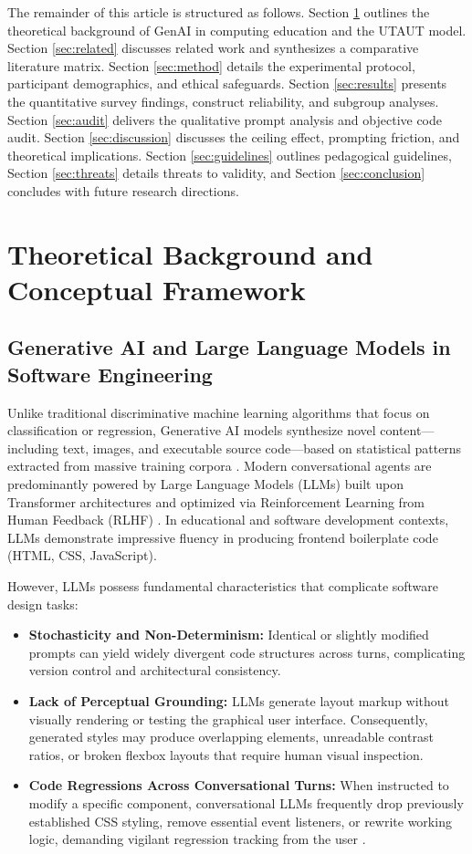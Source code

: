 \documentclass{cleiej}
\begin{document}
The remainder of this article is structured as follows. Section \ref{sec:background} outlines the theoretical background of GenAI in computing education and the UTAUT model. Section \ref{sec:related} discusses related work and synthesizes a comparative literature matrix. Section \ref{sec:method} details the experimental protocol, participant demographics, and ethical safeguards. Section \ref{sec:results} presents the quantitative survey findings, construct reliability, and subgroup analyses. Section \ref{sec:audit} delivers the qualitative prompt analysis and objective code audit. Section \ref{sec:discussion} discusses the ceiling effect, prompting friction, and theoretical implications. Section \ref{sec:guidelines} outlines pedagogical guidelines, Section \ref{sec:threats} details threats to validity, and Section \ref{sec:conclusion} concludes with future research directions.

\section{Theoretical Background and Conceptual Framework}
\label{sec:background}

\subsection{Generative AI and Large Language Models in Software Engineering}
Unlike traditional discriminative machine learning algorithms that focus on classification or regression, Generative AI models synthesize novel content---including text, images, and executable source code---based on statistical patterns extracted from massive training corpora \cite{anderson2023implementing}. Modern conversational agents are predominantly powered by Large Language Models (LLMs) built upon Transformer architectures and optimized via Reinforcement Learning from Human Feedback (RLHF) \cite{denny2024computing}. In educational and software development contexts, LLMs demonstrate impressive fluency in producing frontend boilerplate code (HTML, CSS, JavaScript). 

However, LLMs possess fundamental characteristics that complicate software design tasks:
\begin{itemize}[leftmargin=*]
    \item \textbf{Stochasticity and Non-Determinism:} Identical or slightly modified prompts can yield widely divergent code structures across turns, complicating version control and architectural consistency.
    \item \textbf{Lack of Perceptual Grounding:} LLMs generate layout markup without visually rendering or testing the graphical user interface. Consequently, generated styles may produce overlapping elements, unreadable contrast ratios, or broken flexbox layouts that require human visual inspection.
    \item \textbf{Code Regressions Across Conversational Turns:} When instructed to modify a specific component, conversational LLMs frequently drop previously established CSS styling, remove essential event listeners, or rewrite working logic, demanding vigilant regression tracking from the user \cite{vaithilingam2022expectation}.
\end{itemize}
\end{document}
